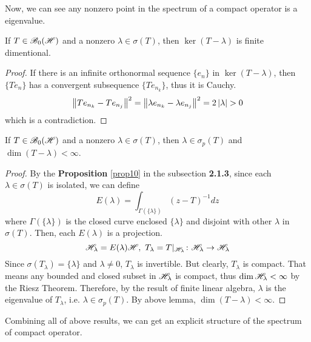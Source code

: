\documentclass[a4paper,11pt]{report}
\begin{document}
Now, we can see any nonzero point in the spectrum of a compact operator is a eigenvalue.

\begin{lem}
	If $T \in \mathscr{B}_{0}\mathscr{(H)}$ and a nonzero $\lambda \in \sigma(T)$, then $\ker{(T-\lambda)}$ is finite dimentional.
\end{lem}
\begin{proof}
	If there is an infinite orthonormal sequence $\{e_n\}$ in $\ker{(T-\lambda)}$, then $\{Te_n\}$ has a convergent subsequence $\{Te_{n_k}\}$, thus it is Cauchy.
	\begin{equation*}
		\left\lVert Te_{n_k}-Te_{n_j}\right\lVert^2 = \left\lVert\lambda e_{n_k}-\lambda e_{n_j}\right\lVert^2 = 2 \left\lvert\lambda\right\lvert > 0
	\end{equation*}
	which is a contradiction.
\end{proof}

\begin{thm}
	If $T \in \mathscr{B}_{0}\mathscr{(H)}$ and a nonzero $\lambda \in \sigma(T)$, then $\lambda \in \sigma_p(T)$ and $\dim{(T-\lambda)} < \infty$.
\end{thm}
\begin{proof}
	By the \textbf{Proposition} \ref{prop10} in the subsection \textbf{2.1.3}, since each $\lambda \in \sigma(T)$ is isolated, we can define
	\begin{equation*}
		E(\lambda) = \int_{\Gamma(\{\lambda\})} (z-T)^{-1} dz 
	\end{equation*}
	where $\Gamma(\{\lambda\})$ is the closed curve enclosed $\{\lambda\}$ and disjoint with other $\lambda$ in $\sigma(T)$. Then, each $E(\lambda)$ is a projection.
	\begin{equation*}
		\mathscr{H}_{\lambda} = E(\lambda)\mathscr{H},~ T_{\lambda} = T|_{\mathscr{H}_{\lambda}} \colon \mathscr{H}_{\lambda} \rightarrow \mathscr{H}_{\lambda}
	\end{equation*}
	Since $\sigma(T_{\lambda}) = \{\lambda\}$ and $\lambda \neq 0$, $T_{\lambda}$ is invertible. But clearly, $T_{\lambda}$ is compact. That means any bounded and closed subset in $\mathscr{H}_{\lambda}$ is compact, thus $\dim{\mathscr{H}_{\lambda}} < \infty$ by the Riesz Theorem. Therefore, by the result of finite linear algebra, $\lambda$ is the eigenvalue of $T_{\lambda}$, i.e. $\lambda \in \sigma_p(T)$. By above lemma, $\dim{(T-\lambda)} < \infty$.
\end{proof}

Combining all of above results, we can get an explicit structure of the spectrum of compact operator.
\end{document}
